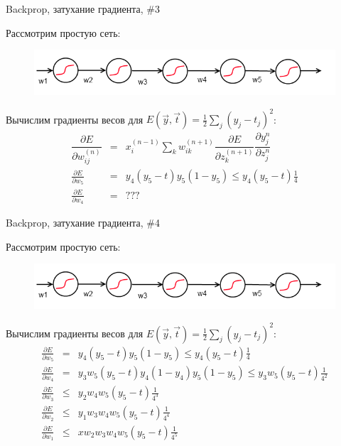 \documentclass[10pt]{beamer}
\begin{document}
\begin{frame}{Backprop, затухание градиента, \#3}

Рассмотрим простую сеть:
\begin{figure}[h!]
	\centering
  	\includegraphics[width=1\textwidth]{images/simple_net.png}
\end{figure}
Вычислим градиенты весов для $E(\vec y, \vec t) = \frac{1}{2} \sum_j(y_j - t_j)^2$:
\begin{eqnarray*}
	\dfrac{\partial E}{\partial w^{(n)}_{ij}} &=& x^{(n - 1)}_i \sum_k w^{(n + 1)}_{ik} \dfrac{\partial E}{\partial z^{(n + 1)}_k}  \dfrac{\partial y^{n}_{j}}{\partial z^{n}_{j}} \\
\frac{\partial E}{\partial w_5} &=& y_4 (y_5 - t) y_5 (1 - y_5) \leq y_4 (y_5 - t) \frac{1}{4} \\
\frac{\partial E}{\partial w_4} &=& ???
\end{eqnarray*}
	
\end{frame}


\begin{frame}{Backprop, затухание градиента, \#4}

Рассмотрим простую сеть:
\begin{figure}[h!]
	\centering
  	\includegraphics[width=1\textwidth]{images/simple_net.png}
\end{figure}
Вычислим градиенты весов для $E(\vec y, \vec t) = \frac{1}{2} \sum_j(y_j - t_j)^2$:
\begin{eqnarray*}
\frac{\partial E}{\partial w_5} &=& y_4 (y_5 - t) y_5 (1 - y_5) \leq y_4 (y_5 - t) \frac{1}{4} \\
\frac{\partial E}{\partial w_4} &=& y_3 w_5 (y_5 - t) y_4 (1 - y_4) y_5 (1 - y_5) \leq y_3 w_5 (y_5 - t) \frac{1}{4^2} \\
\frac{\partial E}{\partial w_3} &\leq& y_2 w_4 w_5 (y_5 - t) \frac{1}{4^3} \\
\frac{\partial E}{\partial w_2} &\leq& y_1 w_3 w_4 w_5 (y_5 - t) \frac{1}{4^4} \\
\frac{\partial E}{\partial w_1} &\leq& x w_2 w_3 w_4 w_5 (y_5 - t) \frac{1}{4^5}
\end{eqnarray*}
	
\end{frame}
\end{document}
